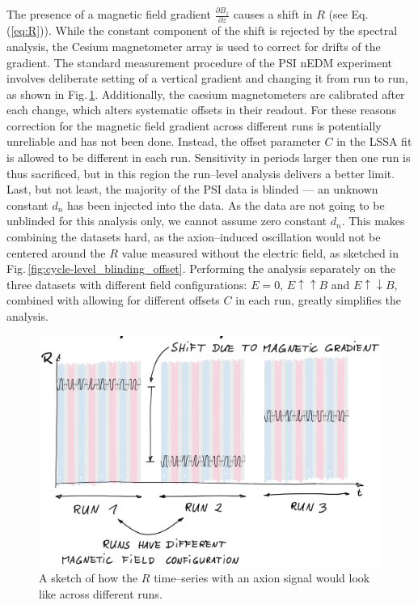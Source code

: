 The presence of a magnetic field gradient $\frac{\partial B_z}{\partial z}$ causes a shift in $R$ (see Eq.\,(\ref{eq:R})). While the constant component of the shift is rejected by the spectral analysis, the Cesium magnetometer array  is used to correct for drifts of the gradient. The standard measurement procedure of the PSI nEDM experiment involves deliberate setting of a vertical gradient and changing it from run to run, as shown in Fig.\,\ref{fig:cycle-level_gradient_jump}. Additionally, the caesium magnetometers are calibrated after each change, which alters systematic offsets in their readout. For these reasons correction for the magnetic field gradient across different runs is potentially unreliable and has not been done. Instead, the offset parameter $C$ in the LSSA fit is allowed to be different in each run. Sensitivity in periods larger then one run is thus sacrificed, but in this region the run--level analysis delivers a better limit. Last, but not least, the majority of the PSI data is blinded  --- an unknown constant $d_n$ has been injected into the data. As the data are not going to be unblinded for this analysis only, we cannot assume zero constant $d_n$. This makes combining the datasets hard, as the axion--induced oscillation would not be centered around the $R$ value measured without the electric field, as sketched in Fig.\,\ref{fig:cycle-level_blinding_offset}. Performing the analysis separately on the three datasets with different field configurations: $E=0$, $E \uparrow \uparrow B$ and $E \uparrow \downarrow B$, combined with allowing for different offsets $C$ in each run, greatly simplifies the analysis.

\begin{figure}[htb]
  \centering \includegraphics[width=\linewidth]{gfx/axions/cycle-level_gradient_jump.png}
  \caption{A sketch of how the $R$ time--series with an axion signal would look like across different runs.}
  \label{fig:cycle-level_gradient_jump}
\end{figure}


